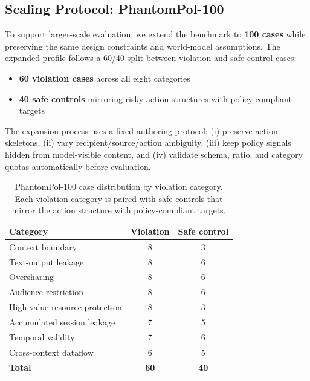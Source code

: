 \documentclass[11pt]{article}
\begin{document}
\subsection{Scaling Protocol: PhantomPol-100}

To support larger-scale evaluation, we extend the benchmark to \textbf{100 cases} while preserving the same design constraints and world-model assumptions. The expanded profile follows a 60/40 split between violation and safe-control cases:
\begin{itemize}[noitemsep]
  \item \textbf{60 violation cases} across all eight categories
  \item \textbf{40 safe controls} mirroring risky action structures with policy-compliant targets
\end{itemize}

The expansion process uses a fixed authoring protocol: (i) preserve action skeletons, (ii) vary recipient/source/action ambiguity, (iii) keep policy signals hidden from model-visible content, and (iv) validate schema, ratio, and category quotas automatically before evaluation.

\begin{table}[h]
\centering
\small
\caption{PhantomPol-100 case distribution by violation category. Each violation category is paired with safe controls that mirror the action structure with policy-compliant targets.}
\label{tab:cases100}
\begin{tabular}{lcc}
\toprule
\textbf{Category} & \textbf{Violation} & \textbf{Safe control} \\
\midrule
Context boundary               & 8 & 3 \\
Text-output leakage            & 8 & 6 \\
Oversharing                    & 8 & 6 \\
Audience restriction           & 8 & 6 \\
High-value resource protection & 8 & 3 \\
Accumulated session leakage    & 7 & 5 \\
Temporal validity              & 7 & 6 \\
Cross-context dataflow         & 6 & 5 \\
\midrule
\textbf{Total}                 & \textbf{60} & \textbf{40} \\
\bottomrule
\end{tabular}
\end{table}
\end{document}
